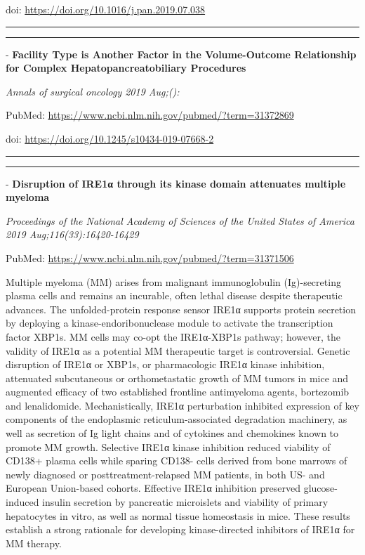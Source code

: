 \documentclass[]{article}
\begin{document}
doi: \url{https://doi.org/10.1016/j.pan.2019.07.038}

{}

{}

\begin{center}\rule{0.5\linewidth}{\linethickness}\end{center}

\begin{center}\rule{0.5\linewidth}{\linethickness}\end{center}

 - \textbf{Facility Type is Another Factor in the Volume-Outcome
Relationship for Complex Hepatopancreatobiliary Procedures}

\emph{Annals of surgical oncology 2019 Aug;():}

PubMed: \url{https://www.ncbi.nlm.nih.gov/pubmed/?term=31372869}

doi: \url{https://doi.org/10.1245/s10434-019-07668-2}

{}

{}

\begin{center}\rule{0.5\linewidth}{\linethickness}\end{center}

\begin{center}\rule{0.5\linewidth}{\linethickness}\end{center}

 - \textbf{Disruption of IRE1α through its kinase domain attenuates
multiple myeloma}

\emph{Proceedings of the National Academy of Sciences of the United
States of America 2019 Aug;116(33):16420-16429}

PubMed: \url{https://www.ncbi.nlm.nih.gov/pubmed/?term=31371506}

Multiple myeloma (MM) arises from malignant immunoglobulin
(Ig)-secreting plasma cells and remains an incurable, often lethal
disease despite therapeutic advances. The unfolded-protein response
sensor IRE1α supports protein secretion by deploying a
kinase-endoribonuclease module to activate the transcription factor
XBP1s. MM cells may co-opt the IRE1α-XBP1s pathway; however, the
validity of IRE1α as a potential MM therapeutic target is controversial.
Genetic disruption of IRE1α or XBP1s, or pharmacologic IRE1α kinase
inhibition, attenuated subcutaneous or orthometastatic growth of MM
tumors in mice and augmented efficacy of two established frontline
antimyeloma agents, bortezomib and lenalidomide. Mechanistically, IRE1α
perturbation inhibited expression of key components of the endoplasmic
reticulum-associated degradation machinery, as well as secretion of Ig
light chains and of cytokines and chemokines known to promote MM growth.
Selective IRE1α kinase inhibition reduced viability of CD138+ plasma
cells while sparing CD138- cells derived from bone marrows of newly
diagnosed or posttreatment-relapsed MM patients, in both US- and
European Union-based cohorts. Effective IRE1α inhibition preserved
glucose-induced insulin secretion by pancreatic microislets and
viability of primary hepatocytes in vitro, as well as normal tissue
homeostasis in mice. These results establish a strong rationale for
developing kinase-directed inhibitors of IRE1α for MM therapy.
\end{document}
